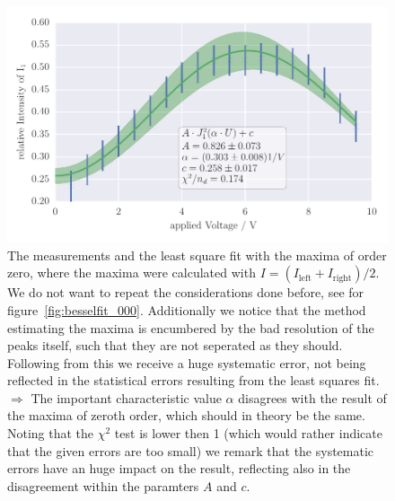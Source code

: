 \newpage

\begin{figure}[htpb]
    \centering
    \includegraphics[width=1\textwidth]{analysis/figures/besselfit_001}
    \caption{The measurements and the least square fit with the maxima of order zero, where
    the maxima were calculated with $I = (I_{\mathrm{left}} +  I_{\mathrm{right}})/2$.
    We do not want to repeat the considerations done before, see for figure~\ref{fig:besselfit_000}.
    Additionally we notice that the method estimating the maxima is encumbered by the 
    bad resolution of the peaks itself, such that they are not seperated as they should. 
    Following from this we receive a huge systematic error, not being reflected in the
    statistical errors resulting from the least squares fit. \\
    $\Rightarrow$ The important characteristic value $\alpha$ disagrees with the result of the maxima of zeroth order, which
    should in theory be the same. Noting that the $\chi^2$ test is lower then 1 (which would rather indicate that
    the given errors are too small) we remark that the systematic errors have an huge impact on the result, reflecting
    also in the disagreement within the paramters $A$ and $c$. 
}
    \label{fig:besselfit_001}
\end{figure}


